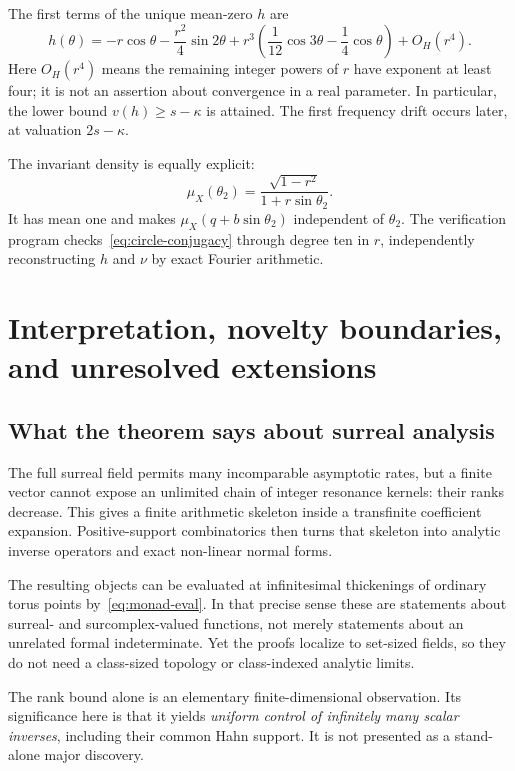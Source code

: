 \documentclass[11pt,letterpaper]{article}
\theoremstyle{definition}
\theoremstyle{remark}
\numberwithin{equation}{section}
\begin{document}
The first terms of the unique mean-zero $h$ are
\begin{equation}\label{eq:circle-h}
 h(\theta)=-r\cos\theta-\frac{r^2}{4}\sin2\theta
       +r^3\left(\frac1{12}\cos3\theta-\frac14\cos\theta\right)
       +O_H(r^4).
\end{equation}
Here $O_H(r^4)$ means the remaining integer powers of $r$ have exponent at
least four; it is not an assertion about convergence in a real parameter.
In particular, the lower bound $v(h)\ge s-\kappa$ is attained.  The first
frequency drift occurs later, at valuation $2s-\kappa$.

The invariant density is equally explicit:
\begin{equation}\label{eq:circle-density}
 \mu_X(\theta_2)=\frac{\sqrt{1-r^2}}{1+r\sin\theta_2}.
\end{equation}
It has mean one and makes $\mu_X(q+b\sin\theta_2)$ independent of
$\theta_2$.  The verification program checks~\eqref{eq:circle-conjugacy}
through degree ten in $r$, independently reconstructing $h$ and $\nu$ by
exact Fourier arithmetic.

\section{Interpretation, novelty boundaries, and unresolved extensions}
\label{sec:limits}

\subsection{What the theorem says about surreal analysis}

The full surreal field permits many incomparable asymptotic rates, but a
finite vector cannot expose an unlimited chain of integer resonance
kernels: their ranks decrease.  This gives a finite arithmetic skeleton
inside a transfinite coefficient expansion.  Positive-support combinatorics
then turns that skeleton into analytic inverse operators and exact
non-linear normal forms.

The resulting objects can be evaluated at infinitesimal thickenings of
ordinary torus points by~\eqref{eq:monad-eval}.  In that precise sense these
are statements about surreal- and surcomplex-valued functions, not merely
statements about an unrelated formal indeterminate.  Yet the proofs
localize to set-sized fields, so they do not need a class-sized topology or
class-indexed analytic limits.

The rank bound alone is an elementary finite-dimensional observation.
Its significance here is that it yields \emph{uniform control of infinitely
many scalar inverses}, including their common Hahn support.  It is not
presented as a stand-alone major discovery.
\end{document}
